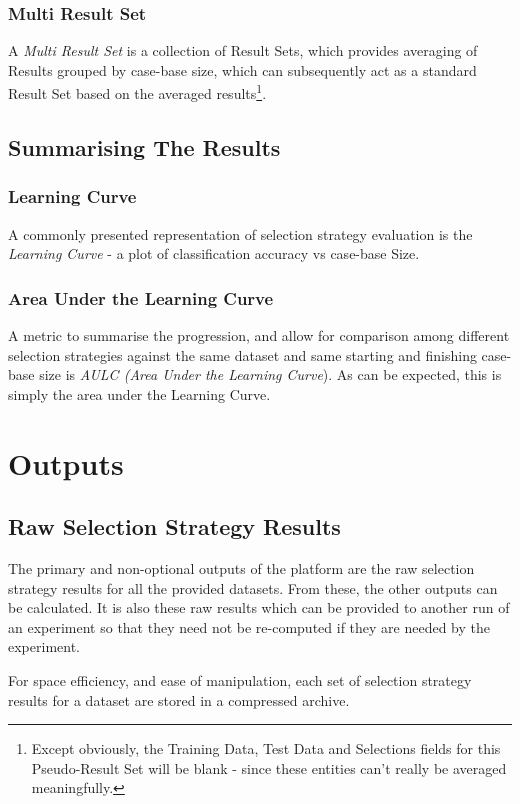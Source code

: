 \documentclass[a4paper,11pt]{report}
\begin{document}
\subsubsection{Multi Result Set}
A \emph{Multi Result Set} is a collection of Result Sets, which provides averaging of Results grouped by case-base size, which can subsequently act as a standard Result Set based on the averaged results\footnote{Except obviously, the Training Data, Test Data and Selections fields for this Pseudo-Result Set will be blank - since these entities can't really be averaged meaningfully.}.

\subsection{Summarising The Results}
\subsubsection{Learning Curve}\label{sec:multiresultset}
A commonly presented representation of selection strategy evaluation is the \emph{Learning Curve} - a plot of classification accuracy vs case-base Size.

\subsubsection{Area Under the Learning Curve}
A metric to summarise the progression, and allow for comparison among different selection strategies against the same dataset and same starting and finishing case-base size is \emph{AULC (Area Under the Learning Curve}). As can be expected, this is simply the area under the Learning Curve.

\section{Outputs}

\subsection{Raw Selection Strategy Results}
The primary and non-optional outputs of the platform are the raw selection strategy results for all the provided datasets. From these, the other outputs can be calculated. It is also these raw results which can be provided to another run of an experiment so that they need not be re-computed if they are needed by the experiment. 

For space efficiency, and ease of manipulation, each set of selection strategy results for a dataset are stored in a compressed archive.
\end{document}
